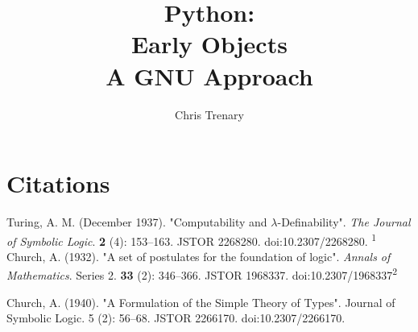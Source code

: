 \documentclass[oneside,12pt]{memoir} %
\title{%
	Python:\\
	Early Objects\\
	A GNU Approach} %
\author{Chris Trenary} %
\begin{document}
\chapter{Citations}

 Turing, A. M. (December 1937). "Computability and \ensuremath{\lambda}-Definability". \emph{The Journal of Symbolic Logic}. \textbf{2} (4): 153–163. JSTOR 2268280. doi:10.2307/2268280. \textsuperscript{1}\\
 
  Church, A. (1932). "A set of postulates for the foundation of logic". \emph{Annals of Mathematics}. Series 2. \textbf{33} (2): 346–366. JSTOR 1968337. doi:10.2307/1968337\textsuperscript{2}
  
  Church, A. (1940). "A Formulation of the Simple Theory of Types". Journal of Symbolic Logic. 5 (2): 56–68. JSTOR 2266170. doi:10.2307/2266170.
  
 
\end{document}
